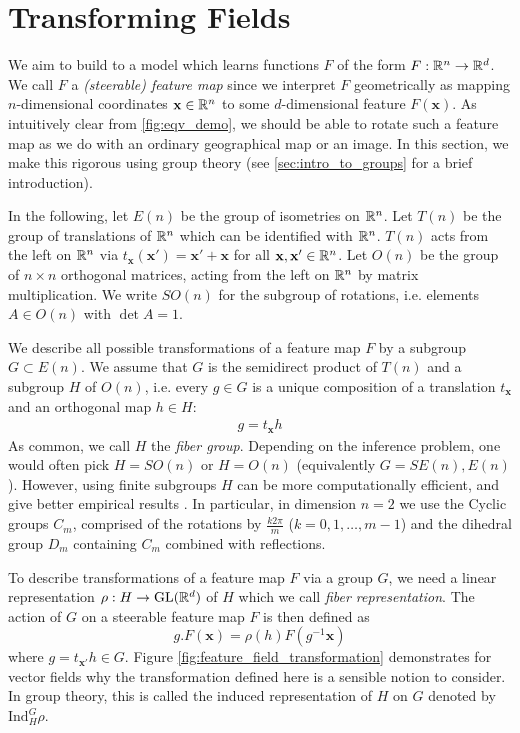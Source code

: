 \section{Transforming Fields}
\label{sec:feature_maps}
We aim to build to a model which learns functions $F$ of the form $F:\mathbb{R}^n\to\mathbb{R}^d$.
We call $F$ a \emph{(steerable) feature map} since we interpret $F$ geometrically as mapping $n$-dimensional coordinates $\mathbf{x}\in\mathbb{R}^n$ to some $d$-dimensional feature $F(\mathbf{x})$.
As intuitively clear from \cref{fig:eqv_demo}, we should be able to rotate such a feature map as we do with an ordinary geographical map or an image.
In this section, we make this rigorous using group theory (see \cref{sec:intro_to_groups} for a brief introduction).

In the following, let $E(n)$ be the group of isometries on $\mathbb{R}^n$.
Let $T(n)$ be the group of translations of $\mathbb{R}^n$ which can be identified with $\mathbb{R}^n$.
$T(n)$ acts from the left on $\mathbb{R}^n$ via $t_{\mathbf{x}}(\mathbf{x}')=\mathbf{x}'+\mathbf{x}$ for all $\mathbf{x},\mathbf{x}'\in\mathbb{R}^n$.
Let $O(n)$ be the group of $n \times n$ orthogonal matrices, acting from the left on $\mathbb{R}^n$ by matrix multiplication.
We write $SO(n)$ for the subgroup of rotations, i.e. elements $A\in O(n)$ with $\det A=1$.

We describe all possible transformations of a feature map $F$ by a subgroup $G \subset E(n)$.
We assume that $G$ is the semidirect product of $T(n)$ and a subgroup $H$ of $O(n)$, i.e. every $g\in G$ is a unique composition of a translation $t_{\mathbf{x}}$ and an orthogonal map $h\in H$: \begin{align} g=t_{\mathbf{x}}h \end{align} As common, we call $H$ the \emph{fiber group}.
Depending on the inference problem, one would often pick $H=SO(n)$ or $H=O(n)$ (equivalently $G=SE(n),E(n)$).
However, using finite subgroups $H$ can be more computationally efficient, and give better empirical results \parencite{E2Steerable}.
In particular, in dimension $n=2$ we use the Cyclic groups $C_m$, comprised of the rotations by $\frac{k2 \pi}{m}$ ($k=0,1,\dots,m-1$) and the dihedral group $D_m$ containing $C_m$ combined with reflections.

To describe transformations of a feature map $F$ via a group $G$, we need a linear representation $\rho:H\to\text{GL}(\mathbb{R}^d)$ of $H$ which we call \emph{fiber representation}.
The action of $G$ on a steerable feature map $F$ is then defined as \begin{equation} \label{eq:transforming_feature_map} g.F(\mathbf{x}) = \rho(h) F(g^{-1}\mathbf{x}) \end{equation} where $g = t_{\mathbf{x}'} h\in G$.
Figure \ref{fig:feature_field_transformation} demonstrates for vector fields why the transformation defined here is a sensible notion to consider.
In group theory, this is called the induced representation of $H$ on $G$ denoted by $\text{Ind}_{H}^{G}\rho$.

